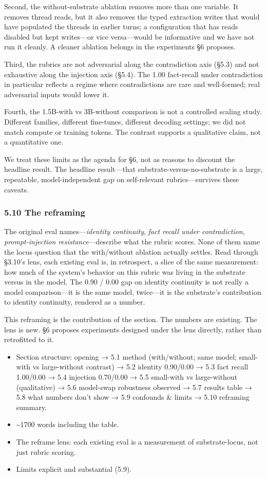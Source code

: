 \documentclass[11pt,letterpaper]{article}
\begin{document}
Second, the without-substrate ablation removes more than one variable. It removes thread reads, but it also removes the typed extraction writes that would have populated the threads in earlier turns; a configuration that has reads disabled but kept writes---or vice versa---would be informative and we have not run it cleanly. A cleaner ablation belongs in the experiments §6 proposes.

Third, the rubrics are not adversarial along the contradiction axis (§5.3) and not exhaustive along the injection axis (§5.4). The 1.00 fact-recall under contradiction in particular reflects a regime where contradictions are rare and well-formed; real adversarial inputs would lower it.

Fourth, the 1.5B-with vs 3B-without comparison is not a controlled scaling study. Different families, different fine-tunes, different decoding settings; we did not match compute or training tokens. The contrast supports a qualitative claim, not a quantitative one.

We treat these limits as the agenda for §6, not as reasons to discount the headline result. The headline result---that substrate-versus-no-substrate is a large, repeatable, model-independent gap on self-relevant rubrics---survives these caveats.

\subsubsection*{5.10 The reframing}

The original eval names---\emph{identity continuity}, \emph{fact recall under contradiction}, \emph{prompt-injection resistance}---describe what the rubric scores. None of them name the locus question that the with/without ablation actually settles. Read through §3.10's lens, each existing eval is, in retrospect, a slice of the same measurement: how much of the system's behavior on this rubric was living in the substrate versus in the model. The 0.90 / 0.00 gap on identity continuity is not really a model comparison---it is the same model, twice---it is the substrate's contribution to identity continuity, rendered as a number.

This reframing is the contribution of the section. The numbers are existing. The lens is new. §6 proposes experiments designed under the lens directly, rather than retrofitted to it.

\begin{itemize}
  \item Section structure: opening → 5.1 method (with/without; same model; small-with vs large-without contrast) → 5.2 identity 0.90/0.00 → 5.3 fact recall 1.00/0.00 → 5.4 injection 0.70/0.00 → 5.5 small-with vs large-without (qualitative) → 5.6 model-swap robustness observed → 5.7 results table → 5.8 what numbers don't show → 5.9 confounds \& limits → 5.10 reframing summary.
  \item \textasciitilde{}1700 words including the table.
  \item The reframe lens: each existing eval is a measurement of substrate-locus, not just rubric scoring.
  \item Limits explicit and substantial (5.9).
\end{itemize}
\end{document}

